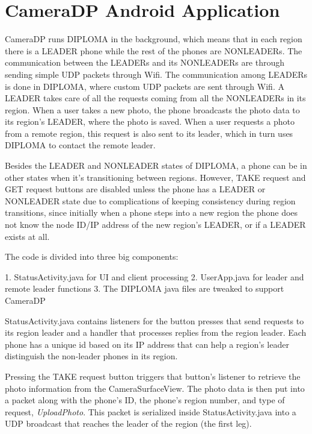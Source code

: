 \chapter{CameraDP Android Application}

CameraDP runs DIPLOMA in the background, which means that in each region there is a LEADER phone while the rest of the phones are NONLEADERs. The communication between the LEADERs and its NONLEADERs are through sending simple UDP packets through Wifi. The communication among LEADERs is done in DIPLOMA, where custom UDP packets are sent through Wifi. A LEADER takes care of all the requests coming from all the NONLEADERs in its region.  When a user takes a new photo, the phone broadcasts the photo data to its region's LEADER, where the photo is saved. When a user requests a photo from a remote region, this request is also sent to its leader, which in turn uses DIPLOMA to contact the remote leader.

Besides the LEADER and NONLEADER states of DIPLOMA, a phone can be in other states when it's transitioning between regions. However, TAKE request and GET request buttons are disabled unless the phone has a LEADER or NONLEADER state due to complications of keeping consistency during region transitions, since initially when a phone steps into a new region the phone does not know the node ID/IP address of the new region's LEADER, or if a LEADER exists at all.

The code is divided into three big components: 

1.  StatusActivity.java for UI and client processing
2.  UserApp.java for leader and remote leader functions
3.  The DIPLOMA java files are tweaked to support CameraDP

StatusActivity.java contains listeners for the button presses that send requests to its region leader and a handler that processes replies from the region leader. Each phone has a unique id based on its IP address that can help a region’s leader distinguish the non-leader phones in its region.  

Pressing the TAKE request button triggers that button’s listener to retrieve the photo information from the CameraSurfaceView. The photo data is then put into a packet along with the phone’s ID, the phone’s region number, and type of request, {\it UploadPhoto}. This packet is serialized inside StatusActivity.java into a UDP broadcast that reaches the leader of the region (the first leg).

